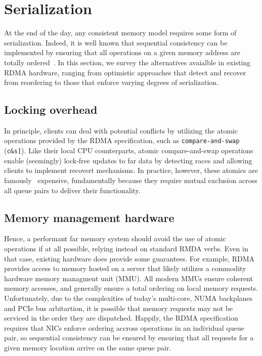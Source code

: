 \section{Serialization}

At the end of the day, any consistent memory model requires some form
of serialization.  Indeed, it is well known that sequential
consistency can be implemented by ensuring that all operations on a
given memory address are totally ordered~\cite{ivy}.  In this section,
we survey the alternatives avaialble in existing RDMA hardware, ranging from optimistic approaches that detect and recover from reordering to those that enforce varying degrees of serialization.

\subsection{Locking overhead}

In principle, clients can deal with potential conflicts by utilizing
the atomic operations provided by the RDMA specification, such as
\texttt{compare-and-swap} (\texttt{c\&s]}).  Like their local CPU
  counterparts, atomic compare-and-swap operations enable (seemingly)
  lock-free updates to far data by detecting races and allowing
  clients to implement recovert mechanisms.  In practice, however,
  these atomics are famously~\cite{herd} expensive, fundamentally
  because they require mutual exclusion across all queue pairs to
  deliver their functionality.

\subsection{Memory management hardware}

Hence, a performant far memory system should avoid the use of atomic
operations if at all possible, relying instead on standard RMDA verbs.
Even in that case, existing hardware does provide some guarantees.  For
example, RDMA provides access to memory hosted on a server that likely
utilizes a commodity hardware memory managment unit (MMU).  All modern
MMUs ensure coherent memory accesses, and generally ensure a total
ordering on local memory requests.  Unfortunately, due to the
complexities of today's multi-core, NUMA backplanes and PCIe bus
arbitartion, it is possible that memory requests may not be serviced
in the order they are dispatched.  Happily, the RDMA specification
requires that NICs enforce ordering accross operations in an
individual queue pair, so sequential consistency can be ensured by
ensuring that all requests for a given memory location arrive on the
same queue pair.



